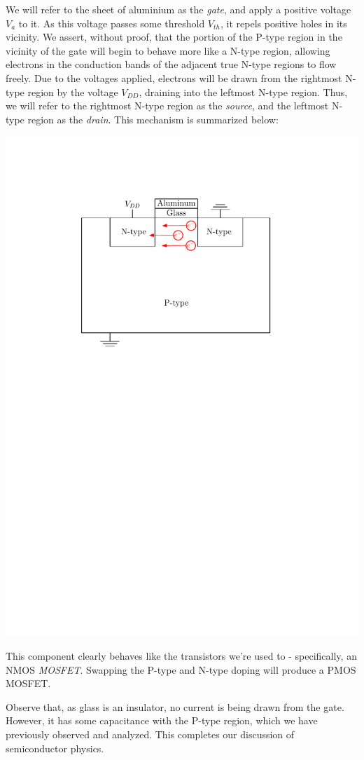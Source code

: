 \documentclass[letterpaper]{article}
\theoremstyle{remark}
\begin{document}
We will refer to the sheet of aluminium as the \emph{gate}, and apply a positive voltage $V_a$ to it. As this voltage passes some threshold $V_{th}$, it repels positive holes in its vicinity. We assert, without proof, that the portion of the P-type region in the vicinity of the gate will begin to behave more like a N-type region, allowing electrons in the conduction bands of the adjacent true N-type regions to flow freely. Due to the voltages applied, electrons will be drawn from the rightmost N-type region by the voltage $V_{DD}$, draining into the leftmost N-type region. Thus, we will refer to the rightmost N-type region as the \emph{source}, and the leftmost N-type region as the \emph{drain}. This mechanism is summarized below:
\begin{center}
    \includegraphics[scale=0.7]{mosfet_conducting.pdf}
\end{center}

This component clearly behaves like the transistors we're used to - specifically, an NMOS \emph{MOSFET}. Swapping the P-type and N-type doping will produce a PMOS MOSFET.

Observe that, as glass is an insulator, no current is being drawn from the gate. However, it has some capacitance with the P-type region, which we have previously observed and analyzed. This completes our discussion of semiconductor physics.
\end{document}
